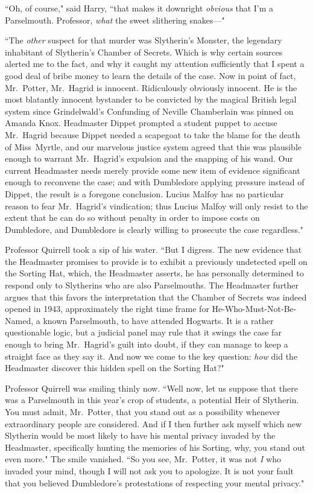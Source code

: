 ``Oh, of course," said Harry, ``that makes it downright \emph{obvious} that I'm a Parselmouth. Professor, \emph{what} the sweet slithering snakes—"

``The \emph{other} suspect for that murder was Slytherin's Monster, the legendary inhabitant of Slytherin's Chamber of Secrets. Which is why certain sources alerted me to the fact, and why it caught my attention sufficiently that I spent a good deal of bribe money to learn the details of the case. Now in point of fact, Mr.~Potter, Mr.~Hagrid is innocent. Ridiculously obviously innocent. He is the most blatantly innocent bystander to be convicted by the magical British legal system since Grindelwald's Confunding of Neville Chamberlain was pinned on Amanda Knox. Headmaster Dippet prompted a student puppet to accuse Mr.~Hagrid because Dippet needed a scapegoat to take the blame for the death of Miss~Myrtle, and our marvelous justice system agreed that this was plausible enough to warrant Mr.~Hagrid's expulsion and the snapping of his wand. Our current Headmaster needs merely provide some new item of evidence significant enough to reconvene the case; and with Dumbledore applying pressure instead of Dippet, the result is a foregone conclusion. Lucius Malfoy has no particular reason to fear Mr.~Hagrid's vindication; thus Lucius Malfoy will only resist to the extent that he can do so without penalty in order to impose costs on Dumbledore, and Dumbledore is clearly willing to prosecute the case regardless."

Professor Quirrell took a sip of his water. ``But I digress. The new evidence that the Headmaster promises to provide is to exhibit a previously undetected spell on the Sorting Hat, which, the Headmaster asserts, he has personally determined to respond only to Slytherins who are also Parselmouths. The Headmaster further argues that this favors the interpretation that the Chamber of Secrets was indeed opened in 1943, approximately the right time frame for He-Who-Must-Not-Be-Named, a known Parselmouth, to have attended Hogwarts. It is a rather questionable logic, but a judicial panel may rule that it swings the case far enough to bring Mr.~Hagrid's guilt into doubt, if they can manage to keep a straight face as they say it. And now we come to the key question: \emph{how} did the Headmaster discover this hidden spell on the Sorting Hat?"

Professor Quirrell was smiling thinly now. ``Well now, let us suppose that there was a Parselmouth in this year's crop of students, a potential Heir of Slytherin. You must admit, Mr.~Potter, that you stand out as a possibility whenever extraordinary people are considered. And if I then further ask myself which new Slytherin would be most likely to have his mental privacy invaded by the Headmaster, specifically hunting the memories of his Sorting, why, you stand out even more." The smile vanished. ``So you see, Mr.~Potter, it was not \emph{I} who invaded your mind, though I will not ask you to apologize. It is not your fault that you believed Dumbledore's protestations of respecting your mental privacy."

